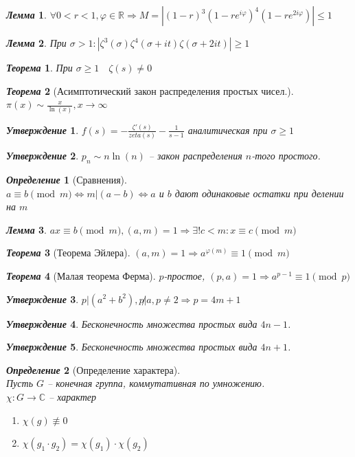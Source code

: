 \documentclass[a4paper,12pt]{article}
\newtheorem{deff2}{\textit{Определение}}
\newtheorem{teo2}{\textit{Теорема}}
\newtheorem{utv2}{\textit{Утверждение}}
\newtheorem{lem2}{\textit{Лемма}}
\newcommand{\ee}{\equiv}
\newcommand{\FI}{\varphi}
\newcommand{\q}{\quad}
\newcommand{\Ra}{\Rightarrow}
\newcommand{\bb}[1]{\mathbb{#1}}
\begin{document}
\begin{lem2} $\forall 0 < r < 1, \varphi\in \bb{R} \Ra M = \left| (1-r)^3(1-re^{i\varphi})^4 (1 - re^{2i\varphi}) \right| \le 1 $
\end{lem2}
\begin{lem2} При $\sigma > 1: |\zeta^3(\sigma)\zeta^4(\sigma+it)\zeta(\sigma+2it)| \ge 1$
\end{lem2}
\begin{teo2} При $\sigma \ge 1 \q \zeta(s) \not= 0$
\end{teo2}
\begin{teo2}[Асимптотический закон распределения простых чисел.]\q\\
$\pi(x)\sim \frac{x}{\ln(x)}, x\to\infty$
\end{teo2}
\begin{utv2} $f(s) = -\frac{\zeta'(s)}{zeta(s)} - \frac{1}{s-1} $ аналитическая при $\sigma \ge 1$
\end{utv2}
\begin{utv2} $p_n \sim n\ln(n)$ -- закон распределения $n$-того простого.
\end{utv2}
\begin{deff2}[Сравнения]\q\\
$a \ee b \pmod{m}\iff m|(a-b) \iff a$ и $b$ дают одинаковые остатки при делении на $m$
\end{deff2}
\begin{lem2} $ax\ee b\pmod{m}, (a,m) = 1\Ra \exists!c<m:x\ee c\pmod{m}$
\end{lem2}
\begin{teo2}[Теорема Эйлера] $(a,m) = 1\Ra a^{\FI(m)} \ee 1\pmod{m}$
\end{teo2}
\begin{teo2}[Малая теорема Ферма] $p$-простое, $(p,a) = 1\Ra a^{p-1} \ee 1\pmod{p}$
\end{teo2}
\begin{utv2} $p|(a^2+b^2), p\not|a, p\not=2 \Ra p = 4m+1$
\end{utv2}
\begin{utv2} Бесконечность множества простых вида $4n-1$.
\end{utv2}
\begin{utv2} Бесконечность множества простых вида $4n+1$.
\end{utv2}
\begin{deff2} [Определение характера]\q\\
Пусть $G$ -- конечная группа, коммутативная по умножению.\\
$\chi:G\to\bb{C}$ -- характер
\begin{enumerate}
\item $\chi(g) \not\ee0 $
\item $\chi(g_1 \cdot g_2) = \chi(g_1)\cdot \chi(g_2)  $
\end{enumerate}
\end{deff2}
\end{document}
